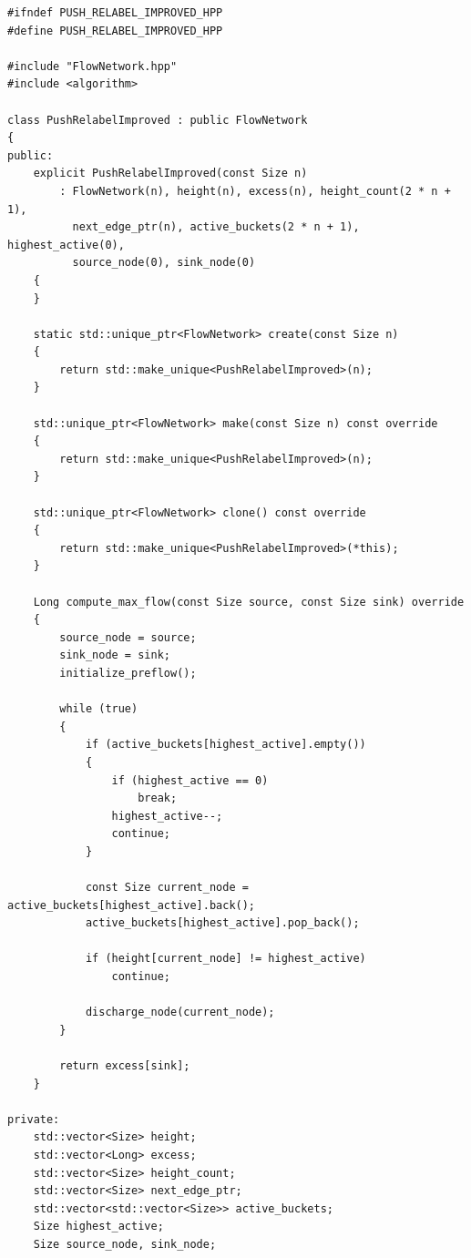 \newpage

\label{ap:push_relabel_improved}

\begin{lstlisting}[caption={Implementação em C++ da classe \lstinline{PushRelabelImproved}, otimizada empiricamente com a Heurística de Lacuna (\textit{Gap Heuristic}).}, label={lst:push_relabel_improved}]
#ifndef PUSH_RELABEL_IMPROVED_HPP
#define PUSH_RELABEL_IMPROVED_HPP

#include "FlowNetwork.hpp"
#include <algorithm>

class PushRelabelImproved : public FlowNetwork
{
public:
	explicit PushRelabelImproved(const Size n)
	    : FlowNetwork(n), height(n), excess(n), height_count(2 * n + 1),
	      next_edge_ptr(n), active_buckets(2 * n + 1), highest_active(0),
	      source_node(0), sink_node(0)
	{
	}

	static std::unique_ptr<FlowNetwork> create(const Size n)
	{
		return std::make_unique<PushRelabelImproved>(n);
	}

	std::unique_ptr<FlowNetwork> make(const Size n) const override
	{
		return std::make_unique<PushRelabelImproved>(n);
	}

	std::unique_ptr<FlowNetwork> clone() const override
	{
		return std::make_unique<PushRelabelImproved>(*this);
	}

	Long compute_max_flow(const Size source, const Size sink) override
	{
		source_node = source;
		sink_node = sink;
		initialize_preflow();

		while (true)
		{
			if (active_buckets[highest_active].empty())
			{
				if (highest_active == 0)
					break;
				highest_active--;
				continue;
			}

			const Size current_node = active_buckets[highest_active].back();
			active_buckets[highest_active].pop_back();

			if (height[current_node] != highest_active)
				continue;

			discharge_node(current_node);
		}

		return excess[sink];
	}

private:
	std::vector<Size> height;
	std::vector<Long> excess;
	std::vector<Size> height_count;
	std::vector<Size> next_edge_ptr;
	std::vector<std::vector<Size>> active_buckets;
	Size highest_active;
	Size source_node, sink_node;


\end{lstlisting}
